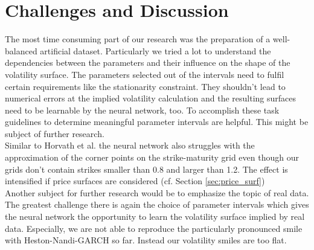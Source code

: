 \documentclass{article}
\begin{document}
\section{Challenges and Discussion}
The most time consuming part of our research was the preparation of a well-balanced artificial dataset. Particularly we tried a lot to understand the dependencies between the parameters and their influence on the shape of the volatility surface. The parameters selected out of the intervals need to fulfil certain requirements like the stationarity constraint. They shouldn't lead to numerical errors at the implied volatility calculation and the resulting surfaces need to be learnable by the neural network, too. To accomplish these task guidelines to determine meaningful parameter intervals are helpful. This might be subject of further research.\\
Similar to Horvath et al. \cite{Blanka} the neural network also struggles with the approximation of the corner points on the strike-maturity grid even though our grids don't contain strikes smaller than 0.8  and larger than 1.2. The effect is intensified if price surfaces are considered (cf. Section \ref{sec:price_surf})  \\
Another subject for further research would be to emphasize the topic of real data. The greatest challenge there is again the choice of parameter intervals which gives the neural network the opportunity to learn the volatility surface implied by real data. Especially, we are not able to reproduce the particularly pronounced smile with Heston-Nandi-GARCH so far. Instead our volatility smiles are too flat. 
\end{document}
